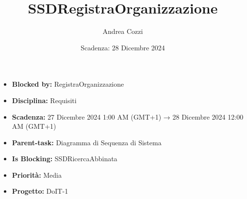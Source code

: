 \title{SSDRegistraOrganizzazione}
\author{Andrea Cozzi}
\date{Scadenza: 28 Dicembre 2024}

\maketitle

\begin{itemize}
    \item \textbf{Blocked by:} RegistraOrganizzazione
    \item \textbf{Disciplina:} Requisiti
    \item \textbf{Scadenza:} 27 Dicembre 2024 1:00 AM (GMT+1) → 28 Dicembre 2024 12:00 AM (GMT+1)
    \item \textbf{Parent-task:} Diagramma di Sequenza di Sistema
    \item \textbf{Is Blocking:} SSDRicercaAbbinata
    \item \textbf{Priorità:} Media
    \item \textbf{Progetto:} DoIT-1
\end{itemize}